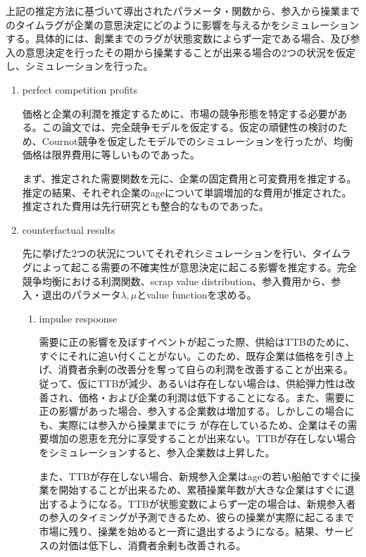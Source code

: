 \documentclass[11pt]{jsarticle}
\begin{document}
上記の推定方法に基づいて導出されたパラメータ・関数から、参入から操業までのタイムラグが企業の意思決定にどのように影響を与えるかをシミュレーションする。具体的には、創業までのラグが状態変数によらず一定である場合、及び参入の意思決定を行ったその期から操業することが出来る場合の2つの状況を仮定し、シミュレーションを行った。

\begin{enumerate}
  \item perfect competition profits

  価格と企業の利潤を推定するために、市場の競争形態を特定する必要がある。この論文では、完全競争モデルを仮定する。仮定の頑健性の検討のため、Cournot競争を仮定したモデルでのシミュレーションを行ったが、均衡価格は限界費用に等しいものであった。

  まず、推定された需要関数を元に、企業の固定費用と可変費用を推定する。推定の結果、それぞれ企業のageについて単調増加的な費用が推定された。推定された費用は先行研究とも整合的なものであった。

  \item counterfactual results

  先に挙げた2つの状況についてそれぞれシミュレーションを行い、タイムラグによって起こる需要の不確実性が意思決定に起こる影響を推定する。完全競争均衡における利潤関数、scrap value distribution、参入費用から、参入・退出のパラメータ$\lambda, \mu$とvalue functionを求める。

  \begin{enumerate}
    \item impulse respoonse

    需要に正の影響を及ぼすイベントが起こった際、供給はTTBのために、すぐにそれに追い付くことがない。このため、既存企業は価格を引き上げ、消費者余剰の改善分を奪って自らの利潤を改善することが出来る。従って、仮にTTBが減少、あるいは存在しない場合は、供給弾力性は改善され、価格・および企業の利潤は低下することになる。また、需要に正の影響があった場合、参入する企業数は増加する。しかしこの場合にも、実際には参入から操業までにラ
    が存在しているため、企業はその需要増加の恩恵を充分に享受することが出来ない。TTBが存在しない場合をシミュレーションすると、参入企業数は上昇した。

    また、TTBが存在しない場合、新規参入企業はageの若い船舶ですぐに操業を開始することが出来るため、累積操業年数が大きな企業はすぐに退出するようになる。TTBが状態変数によらず一定の場合は、新規参入者の参入のタイミングが予測できるため、彼らの操業が実際に起こるまで市場に残り、操業を始めると一斉に退出するようになる。結果、サービスの対価は低下し、消費者余剰も改善される。


\end{enumerate}
\end{enumerate}
\end{document}
